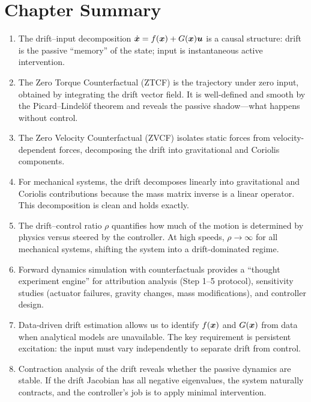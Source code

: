 \section{Chapter Summary}

\begin{enumerate}
\item The drift--input decomposition $\dot{\bm{x}} = f(\bm{x})+G(\bm{x})\bm{u}$ is a causal structure:
      drift is the passive ``memory'' of the state; input is instantaneous active intervention.

\item The Zero Torque Counterfactual (ZTCF) is the trajectory under zero input, obtained by
      integrating the drift vector field. It is well-defined and smooth by the Picard--Lindelöf
      theorem and reveals the passive shadow---what happens without control.

\item The Zero Velocity Counterfactual (ZVCF) isolates static forces from velocity-dependent
      forces, decomposing the drift into gravitational and Coriolis components.

\item For mechanical systems, the drift decomposes linearly into gravitational and Coriolis
      contributions because the mass matrix inverse is a linear operator. This decomposition
      is clean and holds exactly.

\item The drift--control ratio $\rho$ quantifies how much of the motion is determined by
      physics versus steered by the controller. At high speeds, $\rho\to\infty$ for all
      mechanical systems, shifting the system into a drift-dominated regime.

\item Forward dynamics simulation with counterfactuals provides a ``thought experiment engine''
      for attribution analysis (Step 1--5 protocol), sensitivity studies (actuator failures,
      gravity changes, mass modifications), and controller design.

\item Data-driven drift estimation allows us to identify $f(\bm{x})$ and $G(\bm{x})$ from data when
      analytical models are unavailable. The key requirement is persistent excitation:
      the input must vary independently to separate drift from control.

\item Contraction analysis of the drift reveals whether the passive dynamics are stable. If
      the drift Jacobian has all negative eigenvalues, the system naturally contracts, and
      the controller's job is to apply minimal intervention.


\end{enumerate}
